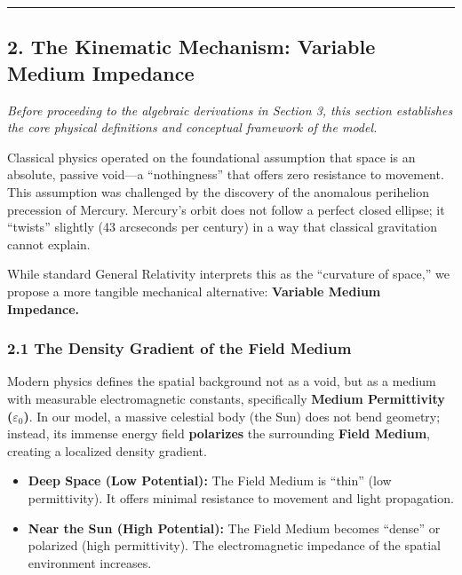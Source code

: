 \documentclass[
]{article}
\providecommand{\tightlist}{%
  \setlength{\itemsep}{0pt}\setlength{\parskip}{0pt}}
\begin{document}
\begin{center}\rule{0.5\linewidth}{0.5pt}\end{center}

\subsection{2. The Kinematic Mechanism: Variable Medium
Impedance}\label{the-kinematic-mechanism-variable-medium-impedance}

\emph{Before proceeding to the algebraic derivations in Section 3, this
section establishes the core physical definitions and conceptual
framework of the model.}

Classical physics operated on the foundational assumption that space is
an absolute, passive void---a ``nothingness'' that offers zero
resistance to movement. This assumption was challenged by the discovery
of the anomalous perihelion precession of Mercury. Mercury's orbit does
not follow a perfect closed ellipse; it ``twists'' slightly (43
arcseconds per century) in a way that classical gravitation cannot
explain.

While standard General Relativity interprets this as the ``curvature of
space,'' we propose a more tangible mechanical alternative:
\textbf{Variable Medium Impedance.}

\subsubsection{2.1 The Density Gradient of the Field
Medium}\label{the-density-gradient-of-the-field-medium}

Modern physics defines the spatial background not as a void, but as a
medium with measurable electromagnetic constants, specifically
\textbf{Medium Permittivity (\(\varepsilon_0\))}. In our model, a
massive celestial body (the Sun) does not bend geometry; instead, its
immense energy field \textbf{polarizes} the surrounding \textbf{Field
Medium}, creating a localized density gradient.

\begin{itemize}
\tightlist
\item
  \textbf{Deep Space (Low Potential):} The Field Medium is ``thin'' (low
  permittivity). It offers minimal resistance to movement and light
  propagation.
\item
  \textbf{Near the Sun (High Potential):} The Field Medium becomes
  ``dense'' or polarized (high permittivity). The electromagnetic
  impedance of the spatial environment increases.
\end{itemize}
\end{document}
